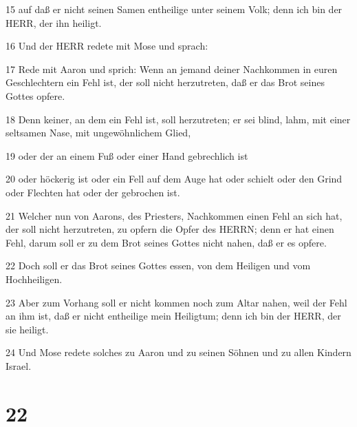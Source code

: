\par 15 auf daß er nicht seinen Samen entheilige unter seinem Volk; denn ich bin der HERR, der ihn heiligt.
\par 16 Und der HERR redete mit Mose und sprach:
\par 17 Rede mit Aaron und sprich: Wenn an jemand deiner Nachkommen in euren Geschlechtern ein Fehl ist, der soll nicht herzutreten, daß er das Brot seines Gottes opfere.
\par 18 Denn keiner, an dem ein Fehl ist, soll herzutreten; er sei blind, lahm, mit einer seltsamen Nase, mit ungewöhnlichem Glied,
\par 19 oder der an einem Fuß oder einer Hand gebrechlich ist
\par 20 oder höckerig ist oder ein Fell auf dem Auge hat oder schielt oder den Grind oder Flechten hat oder der gebrochen ist.
\par 21 Welcher nun von Aarons, des Priesters, Nachkommen einen Fehl an sich hat, der soll nicht herzutreten, zu opfern die Opfer des HERRN; denn er hat einen Fehl, darum soll er zu dem Brot seines Gottes nicht nahen, daß er es opfere.
\par 22 Doch soll er das Brot seines Gottes essen, von dem Heiligen und vom Hochheiligen.
\par 23 Aber zum Vorhang soll er nicht kommen noch zum Altar nahen, weil der Fehl an ihm ist, daß er nicht entheilige mein Heiligtum; denn ich bin der HERR, der sie heiligt.
\par 24 Und Mose redete solches zu Aaron und zu seinen Söhnen und zu allen Kindern Israel.

\chapter{22}

